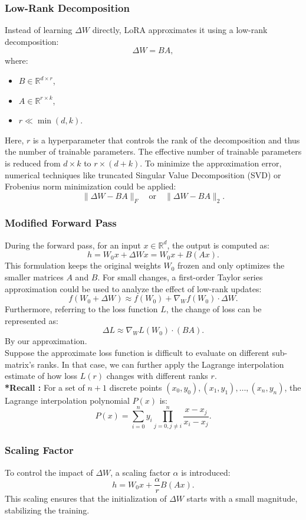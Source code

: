 \documentclass[12pt]{article}
\begin{document}
\subsubsection*{Low-Rank Decomposition}
Instead of learning \( \Delta W \) directly, LoRA approximates it using a low-rank decomposition:
\[
    \Delta W = B A,
\]
where:
\begin{itemize}
    \item \( B \in \mathbb{R}^{d \times r} \),
    \item \( A \in \mathbb{R}^{r \times k} \),
    \item \( r \ll \min(d, k) \).
\end{itemize}
Here, \( r \) is a hyperparameter that controls the rank of the decomposition and thus the number of trainable parameters. The effective number of trainable parameters is reduced from \( d \times k \) to \( r \times (d + k) \). To minimize the approximation error, numerical techniques like truncated Singular Value Decomposition (SVD) or Frobenius norm minimization could be applied:
\[
    \| \Delta W - B A \|_F \quad \text{or} \quad \| \Delta W - B A \|_2.
\]
\subsubsection*{Modified Forward Pass}
During the forward pass, for an input \( x \in \mathbb{R}^{d} \), the output is computed as:
\[
    h = W_0 x + \Delta W x = W_0 x + B (A x).
\]
This formulation keeps the original weights \( W_0 \) frozen and only optimizes the smaller matrices \( A \) and \( B \). For small changes, a first-order Taylor series approximation could be used to analyze the effect of low-rank updates:
\[
    f(W_0 + \Delta W) \approx f(W_0) + \nabla_{W} f(W_0) \cdot \Delta W.
\]
Furthermore, referring to the loss function $L$, the change of loss can be represented as:
\[ 
    \Delta L \approx \nabla_W L(W_0) \cdot (B A).
\]
By our approximation.
\\
Suppose the approximate loss function is difficult to evaluate on different sub-matrix's ranks. In that case, we can further apply the Lagrange interpolation estimate of how loss \( L(r) \) changes with different ranks \( r \). 
\\
\textbf{*Recall :} For a set of \( n+1 \) discrete points \( (x_0, y_0), (x_1, y_1), \ldots, (x_n, y_n) \), the Lagrange interpolation polynomial \( P(x) \) is:
\[
    P(x) = \sum_{i=0}^{n} y_i \prod_{j=0, j \neq i}^{n} \frac{x - x_j}{x_i - x_j}.
\]

\subsubsection*{Scaling Factor}
To control the impact of \( \Delta W \), a scaling factor \( \alpha \) is introduced:
\[
    h = W_0 x + \frac{\alpha}{r} B (A x).
\]
This scaling ensures that the initialization of \( \Delta W \) starts with a small magnitude, stabilizing the training.
\end{document}
